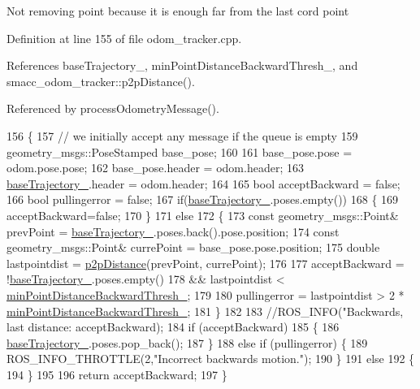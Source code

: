 Not removing point because it is enough far from the last cord point 

Definition at line 155 of file odom\+\_\+tracker.\+cpp.



References base\+Trajectory\+\_\+, min\+Point\+Distance\+Backward\+Thresh\+\_\+, and smacc\+\_\+odom\+\_\+tracker\+::p2p\+Distance().



Referenced by process\+Odometry\+Message().


\begin{DoxyCode}
156 \{
157     \textcolor{comment}{// we initially accept any message if the queue is empty   }
159 \textcolor{comment}{}    geometry\_msgs::PoseStamped base\_pose;
160     
161     base\_pose.pose = odom.pose.pose;
162     base\_pose.header = odom.header;
163     \hyperlink{classsmacc__odom__tracker_1_1OdomTracker_ac3a17be46ab833632c5f63e75c840dc7}{baseTrajectory\_}.header = odom.header;
164 
165     \textcolor{keywordtype}{bool} acceptBackward = \textcolor{keyword}{false};
166     \textcolor{keywordtype}{bool} pullingerror = \textcolor{keyword}{false};
167     \textcolor{keywordflow}{if}(\hyperlink{classsmacc__odom__tracker_1_1OdomTracker_ac3a17be46ab833632c5f63e75c840dc7}{baseTrajectory\_}.poses.empty())
168     \{
169         acceptBackward=\textcolor{keyword}{false};
170     \}
171     \textcolor{keywordflow}{else}
172     \{
173         \textcolor{keyword}{const} geometry\_msgs::Point& prevPoint = \hyperlink{classsmacc__odom__tracker_1_1OdomTracker_ac3a17be46ab833632c5f63e75c840dc7}{baseTrajectory\_}.poses.back().pose.position;
174         \textcolor{keyword}{const} geometry\_msgs::Point& currePoint = base\_pose.pose.position;
175         \textcolor{keywordtype}{double} lastpointdist = \hyperlink{namespacesmacc__odom__tracker_a93496d9bf987249b884e9b0e60778a11}{p2pDistance}(prevPoint, currePoint);
176         
177         acceptBackward = !\hyperlink{classsmacc__odom__tracker_1_1OdomTracker_ac3a17be46ab833632c5f63e75c840dc7}{baseTrajectory\_}.poses.empty() 
178                         && lastpointdist < \hyperlink{classsmacc__odom__tracker_1_1OdomTracker_a79d94520c5da1852602aaf264377a82f}{minPointDistanceBackwardThresh\_};
179 
180         pullingerror = lastpointdist > 2 * \hyperlink{classsmacc__odom__tracker_1_1OdomTracker_a79d94520c5da1852602aaf264377a82f}{minPointDistanceBackwardThresh\_};
181     \}
182 
183     \textcolor{comment}{//ROS\_INFO("Backwards, last distance: %
       acceptBackward);}
184     \textcolor{keywordflow}{if} (acceptBackward) 
185     \{
186         \hyperlink{classsmacc__odom__tracker_1_1OdomTracker_ac3a17be46ab833632c5f63e75c840dc7}{baseTrajectory\_}.poses.pop\_back();
187     \} 
188     \textcolor{keywordflow}{else} \textcolor{keywordflow}{if} (pullingerror) \{
189         ROS\_INFO\_THROTTLE(2,\textcolor{stringliteral}{"Incorrect backwards motion."});
190     \} 
191     \textcolor{keywordflow}{else} 
192     \{
194     \}
195 
196     \textcolor{keywordflow}{return} acceptBackward;
197 \}
\end{DoxyCode}


